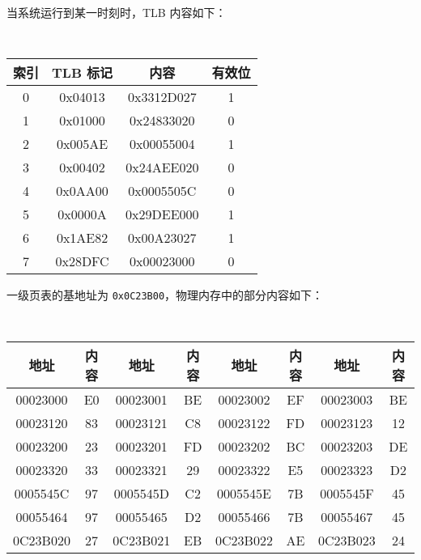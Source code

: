 \begin{problems}
\begin{table}[H]
\begin{tabular}{cccccccc}
            \end{tabular}
        \end{table}
        当系统运行到某一时刻时，TLB 内容如下：
        \begin{table}[H]
            \tt
            \centering
            \begin{tabular}{|c|c|c|c|}
                \hline
                索引 & TLB 标记 & 内容 & 有效位 \\ \hline
                0 & 0x04013 & 0x3312D027 & 1 \\ \hline
                1 & 0x01000 & 0x24833020 & 0 \\ \hline
                2 & 0x005AE & 0x00055004 & 1 \\ \hline
                3 & 0x00402 & 0x24AEE020 & 0 \\ \hline
                4 & 0x0AA00 & 0x0005505C & 0 \\ \hline
                5 & 0x0000A & 0x29DEE000 & 1 \\ \hline
                6 & 0x1AE82 & 0x00A23027 & 1 \\ \hline
                7 & 0x28DFC & 0x00023000 & 0 \\ \hline
            \end{tabular}
        \end{table}
        一级页表的基地址为 \verb|0x0C23B00|，物理内存中的部分内容如下：
        \begin{table}[H]
            \tt
            \centering
            \begin{tabular}{|c|c|c|c|c|c|c|c|}
                \hline
                地址 & 内容 & 地址 & 内容 & 地址 & 内容 & 地址 & 内容 \\ \hline
                00023000 & E0 & 00023001 & BE & 00023002 & EF & 00023003 & BE \\ \hline
                00023120 & 83 & 00023121 & C8 & 00023122 & FD & 00023123 & 12 \\ \hline
                00023200 & 23 & 00023201 & FD & 00023202 & BC & 00023203 & DE \\ \hline
                00023320 & 33 & 00023321 & 29 & 00023322 & E5 & 00023323 & D2 \\ \hline
                0005545C & 97 & 0005545D & C2 & 0005545E & 7B & 0005545F & 45 \\ \hline
                00055464 & 97 & 00055465 & D2 & 00055466 & 7B & 00055467 & 45 \\ \hline
                0C23B020 & 27 & 0C23B021 & EB & 0C23B022 & AE & 0C23B023 & 24 \\ \hline

\end{tabular}
\end{table}
\end{problems}
